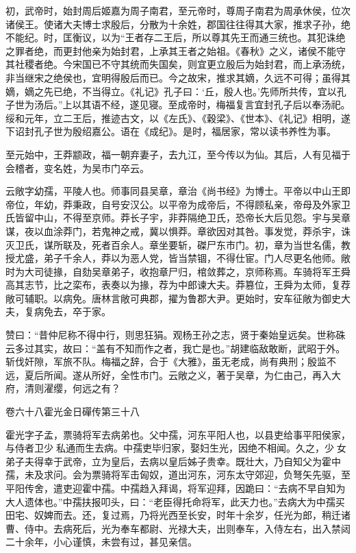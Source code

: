 \documentclass[12pt,UTF8]{ctexbook}
\begin{document}
初，武帝时，始封周后姬嘉为周子南君，至元帝时，尊周子南君为周承休侯，位次诸侯王。使诸大夫博士求殷后，分散为十余姓，郡国往往得其大家，推求子孙，绝不能纪。时，匡衡议，以为“王者存二王后，所以尊其先王而通三统也。其犯诛绝之罪者绝，而更封他亲为始封君，上承其王者之始祖。《春秋》之义，诸侯不能守其社稷者绝。今宋国已不守其统而失国矣，则宜更立殷后为始封君，而上承汤统，非当继宋之绝侯也，宜明得殷后而已。今之故宋，推求其嫡，久远不可得；虽得其嫡，嫡之先已绝，不当得立。《礼记》孔子曰：‘丘，殷人也。’先师所共传，宜以孔子世为汤后。”上以其语不经，遂见寝。至成帝时，梅福复言宜封孔子后以奉汤祀。绥和元年，立二王后，推迹古文，以《左氏》、《穀梁》、《世本》、《礼记》相明，遂下诏封孔子世为殷绍嘉公。语在《成纪》。是时，福居家，常以读书养性为事。



至元始中，王莽颛政，福一朝弃妻子，去九江，至今传以为仙。其后，人有见福于会稽者，变名姓，为吴市门卒云。



云敞字幼孺，平陵人也。师事同县吴章，章治《尚书经》为博士。平帝以中山王即帝位，年幼，莽秉政，自号安汉公。以平帝为成帝后，不得顾私亲，帝母及外家卫氏皆留中山，不得至京师。莽长子宇，非莽隔绝卫氏，恐帝长大后见怨。宇与吴章谋，夜以血涂莽门，若鬼神之戒，冀以惧莽。章欲因对其咎。事发觉，莽杀宇，诛灭卫氏，谋所联及，死者百余人。章坐要斩，磔尸东市门。初，章为当世名儒，教授尤盛，弟子千余人，莽以为恶人党，皆当禁锢，不得仕宦。门人尽更名他师。敞时为大司徒掾，自劾吴章弟子，收抱章尸归，棺敛葬之，京师称焉。车骑将军王舜高其志节，比之栾布，表奏以为掾，荐为中郎谏大夫。莽篡位，王舜为太师，复荐敞可辅职。以病免。唐林言敞可典郡，擢为鲁郡大尹。更始时，安车征敞为御史大夫，复病免去，卒于家。



赞曰：“昔仲尼称不得中行，则思狂狷。观杨王孙之志，贤于秦始皇远矣。世称硃云多过其实，故曰：“盖有不知而作之者，我亡是也。”胡建临敌敢断，武昭于外。斩伐奸隙，军旅不队。梅福之辞，合于《大雅》，虽无老成，尚有典刑；殷监不远，夏后所闻。遂从所好，全性市门。云敞之义，著于吴章，为仁由己，再入大府，清则濯缨，何远之有？





卷六十八霍光金日磾传第三十八



霍光字子孟，票骑将军去病弟也。父中孺，河东平阳人也，以县吏给事平阳侯家，与侍者卫少私通而生去病。中孺吏毕归家，娶妇生光，因绝不相闻。久之，少女弟子夫得幸于武帝，立为皇后，去病以皇后姊子贵幸。既壮大，乃自知父为霍中孺，未及求问。会为票骑将军击匈奴，道出河东，河东太守郊迎，负弩矢先驱，至平阳传舍，遣吏迎霍中孺。中孺趋入拜谒，将军迎拜，因跪曰：“去病不早自知为大人遗体也。”中孺扶报叩头，曰：“老臣得托命将军，此天力也。”去病大为中孺买田宅、奴婢而去。还，复过焉，乃将光西至长安，时年十余岁，任光为郎，稍迁诸曹、侍中。去病死后，光为奉车都尉、光禄大夫，出则奉车，入侍左右，出入禁闼二十余年，小心谨慎，未尝有过，甚见亲信。
\end{document}
